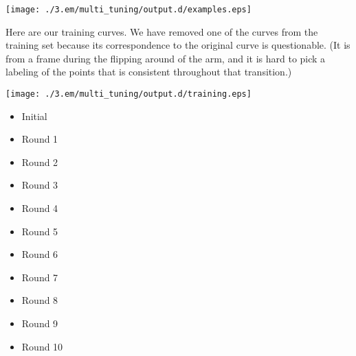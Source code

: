 \documentclass{book}
\begin{document}
\texttt{[image: ./3.em/multi\_tuning/output.d/examples.eps]}

Here are our training curves. We have removed one of the curves from
the training set because its correspondence to the original curve is
questionable. (It is from a frame during the flipping around of the
arm, and it is hard to pick a labeling of the points that is
consistent throughout that transition.)

\texttt{[image: ./3.em/multi\_tuning/output.d/training.eps]}
\begin{itemize}

\item Initial\\
\label{sec-3_4_2_1}%


\item Round 1\\
\label{sec-3_4_2_2}%


\item Round 2\\
\label{sec-3_4_2_3}%


\item Round 3\\
\label{sec-3_4_2_4}%


\item Round 4\\
\label{sec-3_4_2_5}%


\item Round 5\\
\label{sec-3_4_2_6}%


\item Round 6\\
\label{sec-3_4_2_7}%


\item Round 7\\
\label{sec-3_4_2_8}%


\item Round 8\\
\label{sec-3_4_2_9}%


\item Round 9\\
\label{sec-3_4_2_10}%


\item Round 10\\
\label{sec-3_4_2_11}%

\end{itemize} %
\end{document}
